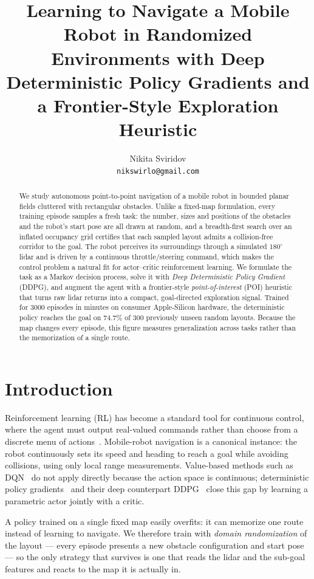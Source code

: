 \documentclass[11pt,a4paper]{article}
\title{\vspace{-1.2cm}\bfseries Learning to Navigate a Mobile Robot in
Randomized Environments with Deep Deterministic Policy Gradients and a
Frontier-Style Exploration Heuristic}
\author{Nikita Sviridov\\\small\texttt{nikswirlo@gmail.com}}
\date{}
\newcommand{\NumEpisodes}{3000}
\newcommand{\EvalN}{300}
\newcommand{\EvalRate}{74.7\%}
\begin{document}
\maketitle

\begin{abstract}
\noindent
We study autonomous point-to-point navigation of a mobile robot in bounded
planar fields cluttered with rectangular obstacles. Unlike a fixed-map
formulation, every training episode samples a fresh task: the number, sizes
and positions of the obstacles and the robot's start pose are all drawn at
random, and a breadth-first search over an inflated occupancy grid certifies
that each sampled layout admits a collision-free corridor to the goal. The
robot perceives its surroundings through a simulated $180^\circ$ lidar and is
driven by a continuous throttle/steering command, which makes the control
problem a natural fit for actor--critic reinforcement learning. We formulate
the task as a Markov decision process, solve it with \emph{Deep Deterministic
Policy Gradient} (DDPG), and augment the agent with a frontier-style
\emph{point-of-interest} (POI) heuristic that turns raw lidar returns into a
compact, goal-directed exploration signal. Trained for \NumEpisodes{} episodes
in minutes on consumer Apple-Silicon hardware, the deterministic policy
reaches the goal on \EvalRate{} of \EvalN{} previously unseen random layouts. Because the map
changes every episode, this figure measures generalization across tasks rather
than the memorization of a single route.
\end{abstract}

\section{Introduction}
Reinforcement learning (RL) has become a standard tool for continuous control,
where the agent must output real-valued commands rather than choose from a
discrete menu of actions~\cite{sutton2018}. Mobile-robot navigation is a
canonical instance: the robot continuously sets its speed and heading to reach a
goal while avoiding collisions, using only local range measurements. Value-based
methods such as DQN~\cite{mnih2015} do not apply directly because the action
space is continuous; deterministic policy gradients~\cite{silver2014} and their
deep counterpart DDPG~\cite{lillicrap2016} close this gap by learning a
parametric actor jointly with a critic.

A policy trained on a single fixed map easily overfits: it can memorize one
route instead of learning to navigate. We therefore train with \emph{domain
randomization} of the layout — every episode presents a new obstacle
configuration and start pose — so the only strategy that survives is one that
reads the lidar and the sub-goal features and reacts to the map it is actually
in.
\end{document}
